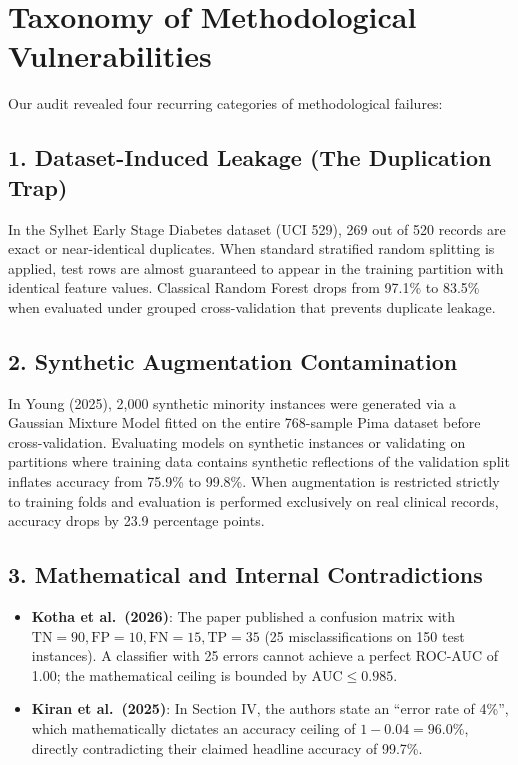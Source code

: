 \documentclass[11pt,a4paper]{article}
\begin{document}
\section{Taxonomy of Methodological Vulnerabilities}
Our audit revealed four recurring categories of methodological failures:

\subsection{1. Dataset-Induced Leakage (The Duplication Trap)}
In the Sylhet Early Stage Diabetes dataset (UCI 529), 269 out of 520 records are exact or near-identical duplicates. When standard stratified random splitting is applied, test rows are almost guaranteed to appear in the training partition with identical feature values. Classical Random Forest drops from 97.1\% to 83.5\% when evaluated under grouped cross-validation that prevents duplicate leakage.

\subsection{2. Synthetic Augmentation Contamination}
In Young (2025), 2,000 synthetic minority instances were generated via a Gaussian Mixture Model fitted on the entire 768-sample Pima dataset before cross-validation. Evaluating models on synthetic instances or validating on partitions where training data contains synthetic reflections of the validation split inflates accuracy from 75.9\% to 99.8\%. When augmentation is restricted strictly to training folds and evaluation is performed exclusively on real clinical records, accuracy drops by 23.9 percentage points.

\subsection{3. Mathematical and Internal Contradictions}
\begin{itemize}[leftmargin=*]
  \item \textbf{Kotha et al.\ (2026)}: The paper published a confusion matrix with $\text{TN}=90, \text{FP}=10, \text{FN}=15, \text{TP}=35$ (25 misclassifications on 150 test instances). A classifier with 25 errors cannot achieve a perfect ROC-AUC of 1.00; the mathematical ceiling is bounded by $\text{AUC} \leq 0.985$.
  \item \textbf{Kiran et al.\ (2025)}: In Section IV, the authors state an ``error rate of 4\%'', which mathematically dictates an accuracy ceiling of $1 - 0.04 = 96.0\%$, directly contradicting their claimed headline accuracy of 99.7\%.
\end{itemize}
\end{document}
